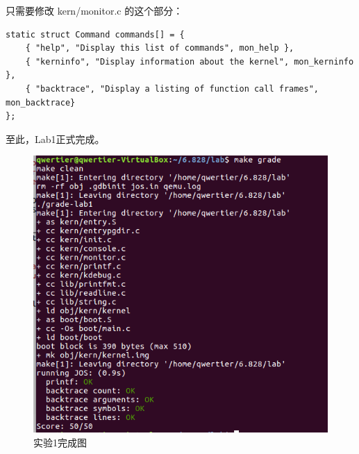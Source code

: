 \begin{ExerciseList}

只需要修改 kern/monitor.c 的这个部分：

\begin{verbatim}
static struct Command commands[] = {
    { "help", "Display this list of commands", mon_help },
    { "kerninfo", "Display information about the kernel", mon_kerninfo },
    { "backtrace", "Display a listing of function call frames", mon_backtrace}
};
\end{verbatim}

至此，Lab1正式完成。

\begin{figure}[H]
  \centering
  \includegraphics[width=6in]{figures/lab1/finish.png}
  \caption{实验1完成图}\label{fig:lab1:finish}
\end{figure}

\end{ExerciseList}
